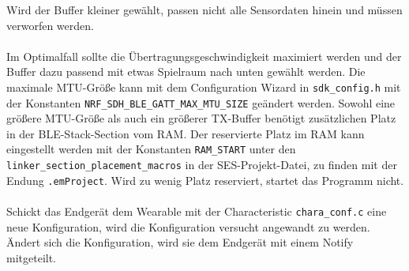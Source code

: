 Wird der Buffer kleiner gewählt, passen nicht alle Sensordaten hinein und müssen verworfen werden.\\\\
Im Optimalfall sollte die Übertragungsgeschwindigkeit maximiert werden und der Buffer dazu passend mit etwas Spielraum nach unten gewählt werden.
Die maximale MTU-Größe kann mit dem Configuration Wizard in \texttt{sdk\_config.h} mit der Konstanten \texttt{NRF\_SDH\_BLE\_GATT\_MAX\_MTU\_SIZE} geändert werden.
Sowohl eine größere MTU-Größe als auch ein größerer TX-Buffer benötigt zusätzlichen Platz in der BLE-Stack-Section vom RAM.
Der reservierte Platz im RAM kann eingestellt werden mit der Konstanten \texttt{RAM\_START} unter den \texttt{linker\_section\_placement\_macros} in der SES-Projekt-Datei, zu finden mit der Endung \texttt{.emProject}.
Wird zu wenig Platz reserviert, startet das Programm nicht.\\\\
Schickt das Endgerät dem Wearable mit der Characteristic \texttt{chara\_conf.c} eine neue Konfiguration, wird die Konfiguration versucht angewandt zu werden.
Ändert sich die Konfiguration, wird sie dem Endgerät mit einem Notify mitgeteilt.

